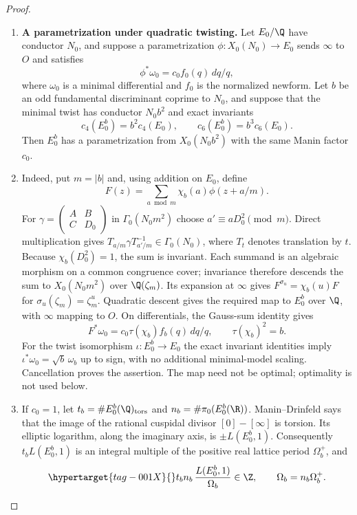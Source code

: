 \begin{proof}
\begin{enumerate}[label=\arabic*.,leftmargin=*]
\item \textbf{A parametrization under quadratic twisting.}
Let $E_0/\Q$ have conductor $N_0$, and suppose a parametrization
$\phi:X_0(N_0)\to E_0$ sends $\infty$ to $O$ and satisfies
\[
 \phi^*\omega_0=c_0f_0(q)\,dq/q,
\]
where $\omega_0$ is a minimal differential and $f_0$ is the normalized
newform. Let $b$ be an odd fundamental discriminant coprime to $N_0$,
and suppose that the minimal twist has conductor $N_0b^2$ and exact
invariants
\[
 c_4(E_0^b)=b^2c_4(E_0),\qquad
 c_6(E_0^b)=b^3c_6(E_0).
\]
Then $E_0^b$ has a parametrization from $X_0(N_0b^2)$ with the same
Manin factor $c_0$.

\item Indeed, put $m=|b|$ and, using addition on $E_0$, define
\[
 F(z)=\sum_{a\bmod m}\chi_b(a)\phi(z+a/m).
\]
For $\gamma=\left(\begin{smallmatrix}A&B\\C&D_0\end{smallmatrix}\right)$
in $\Gamma_0(N_0m^2)$ choose $a'\equiv aD_0^2\pmod m$.
Direct multiplication gives
$T_{a/m}\gamma T_{a'/m}^{-1}\in\Gamma_0(N_0)$, where $T_t$
denotes translation by $t$. Because $\chi_b(D_0^2)=1$, the sum is
invariant. Each summand is an algebraic morphism on a common
congruence cover; invariance therefore descends the sum to
$X_0(N_0m^2)$ over $\Q(\zeta_m)$. Its expansion at $\infty$
gives $F^{\sigma_u}=\chi_b(u)F$ for
$\sigma_u(\zeta_m)=\zeta_m^u$. Quadratic descent gives the required
map to $E_0^b$ over $\Q$, with $\infty$ mapping to $O$.
On differentials, the Gauss-sum identity gives
\[
 F^*\omega_0=c_0\tau(\chi_b)f_b(q)\,dq/q,
 \qquad \tau(\chi_b)^2=b.
\]
For the twist isomorphism $\iota:E_0^b\to E_0$ the exact invariant
identities imply
$\iota^*\omega_0=\sqrt b\,\omega_b$ up to sign, with no additional
minimal-model scaling. Cancellation proves the assertion. The map
need not be optimal; optimality is not used below.

\item If $c_0=1$, let $t_b=\#E_0^b(\Q)_{\rm tors}$ and
$n_b=\#\pi_0(E_0^b(\R))$. Manin--Drinfeld \citep[Section~1, unnumbered theorem, p.~83 of the Russian original]{Drinfeld1973} says that the image of
the rational cuspidal divisor $[0]-[\infty]$ is torsion. Its elliptic
logarithm, along the imaginary axis, is $\pm L(E_0^b,1)$.
Consequently $t_bL(E_0^b,1)$ is an integral multiple of the positive
real lattice period $\Omega_b^+$, and
\begin{equation}\hypertarget{tag-001X}{}\label{ari:eq:Cgz-central-integrality}
 t_bn_b\,\frac{L(E_0^b,1)}{\Omega_b}\in\Z,
 \qquad \Omega_b=n_b\Omega_b^+.
\end{equation}


\end{enumerate}
\end{proof}
